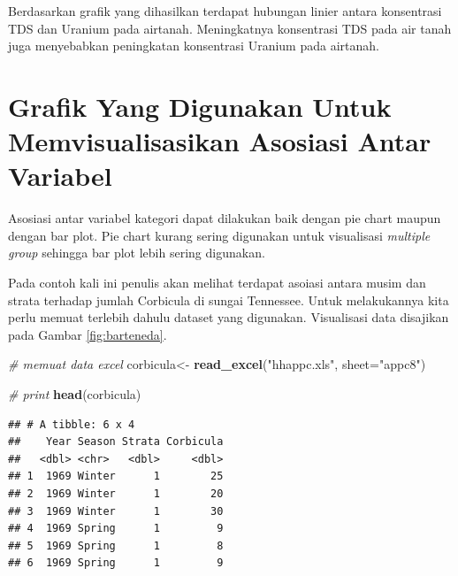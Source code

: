 \documentclass[]{book}
\newenvironment{Shaded}{\begin{snugshade}}{\end{snugshade}}
\newcommand{\KeywordTok}[1]{\textcolor[rgb]{0.13,0.29,0.53}{\textbf{#1}}}
\newcommand{\DataTypeTok}[1]{\textcolor[rgb]{0.13,0.29,0.53}{#1}}
\newcommand{\StringTok}[1]{\textcolor[rgb]{0.31,0.60,0.02}{#1}}
\newcommand{\CommentTok}[1]{\textcolor[rgb]{0.56,0.35,0.01}{\textit{#1}}}
\newcommand{\NormalTok}[1]{#1}
\begin{document}
Berdasarkan grafik yang dihasilkan terdapat hubungan linier antara
konsentrasi TDS dan Uranium pada airtanah. Meningkatnya konsentrasi TDS
pada air tanah juga menyebabkan peningkatan konsentrasi Uranium pada
airtanah.

\section{Grafik Yang Digunakan Untuk Memvisualisasikan Asosiasi Antar
Variabel}\label{grafik-yang-digunakan-untuk-memvisualisasikan-asosiasi-antar-variabel}

Asosiasi antar variabel kategori dapat dilakukan baik dengan pie chart
maupun dengan bar plot. Pie chart kurang sering digunakan untuk
visualisasi \emph{multiple group} sehingga bar plot lebih sering
digunakan.

Pada contoh kali ini penulis akan melihat terdapat asoiasi antara musim
dan strata terhadap jumlah Corbicula di sungai Tennessee. Untuk
melakukannya kita perlu memuat terlebih dahulu dataset yang digunakan.
Visualisasi data disajikan pada Gambar \ref{fig:barteneda}.

\begin{Shaded}
\begin{Highlighting}[]
\CommentTok{# memuat data excel}
\NormalTok{corbicula<-}\StringTok{ }\KeywordTok{read_excel}\NormalTok{(}\StringTok{"hhappc.xls"}\NormalTok{, }\DataTypeTok{sheet=}\StringTok{"appc8"}\NormalTok{)}

\CommentTok{# print}
\KeywordTok{head}\NormalTok{(corbicula)}
\end{Highlighting}
\end{Shaded}

\begin{verbatim}
## # A tibble: 6 x 4
##    Year Season Strata Corbicula
##   <dbl> <chr>   <dbl>     <dbl>
## 1  1969 Winter      1        25
## 2  1969 Winter      1        20
## 3  1969 Winter      1        30
## 4  1969 Spring      1         9
## 5  1969 Spring      1         8
## 6  1969 Spring      1         9
\end{verbatim}
\end{document}
